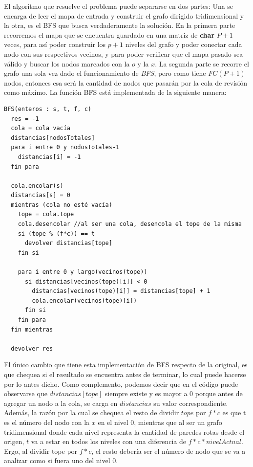             El algoritmo que resuelve el problema puede separarse en dos partes: Una se encarga de leer el mapa de entrada y construir el grafo dirigido tridimensional y la otra, es el BFS que busca verdaderamente la solución.
            En la primera parte recorremos el mapa que se encuentra guardado en una matriz de \textbf{char} $P+1$ veces, para así poder construir los $p+1$ niveles del grafo y poder conectar cada nodo con sus respectivos vecinos, y para poder verificar que el mapa pasado sea válido y buscar los nodos marcados con la $o$ y la $x$.
            La segunda parte se recorre el grafo una sola vez dado el funcionamiento de \textit{BFS}, pero como tiene $FC(P+1)$ nodos, entonces esa será la cantidad de nodos que pasarán por la cola de revisión como máximo. La función BFS está implementada de la siguiente manera:


            \begin{codesnippet}
            \begin{verbatim}
BFS(enteros : s, t, f, c)
  res = -1
  cola = cola vacía
  distancias[nodosTotales]
  para i entre 0 y nodosTotales-1
    distancias[i] = -1
  fin para

  cola.encolar(s)
  distancias[s] = 0
  mientras (cola no esté vacía)
    tope = cola.tope
    cola.desencolar //al ser una cola, desencola el tope de la misma
    si (tope % (f*c)) == t
      devolver distancias[tope]
    fin si

    para i entre 0 y largo(vecinos(tope))
      si distancias[vecinos(tope)[i]] < 0
        distancias[vecinos(tope)[i]] = distancias[tope] + 1
        cola.encolar(vecinos(tope)[i])
      fin si
    fin para
  fin mientras

  devolver res
            \end{verbatim}
            \end{codesnippet}

            El único cambio que tiene esta implementación de BFS respecto de la original, es que chequea si el resultado se encuentra antes de terminar, lo cual puede hacerse por lo antes dicho. Como complemento, podemos decir que en el código puede observarse que $distancias[tope]$ siempre existe y es mayor a $0$ porque antes de agregar un nodo a la cola, se carga en $distancias$ su valor correspondiente. Además, la razón por la cual se chequea el resto de dividir $tope$ por $f*c$ es que t es el número del nodo con la $x$ en el nivel 0, mientras que al ser un grafo tridimensional donde cada nivel representa la cantidad de paredes rotas desde el origen, $t$ va a estar en todos los niveles con una diferencia de $f*c*nivelActual$. Ergo, al dividir tope por $f*c$, el resto debería ser el número de nodo que se va a analizar como si fuera uno del nivel 0.



